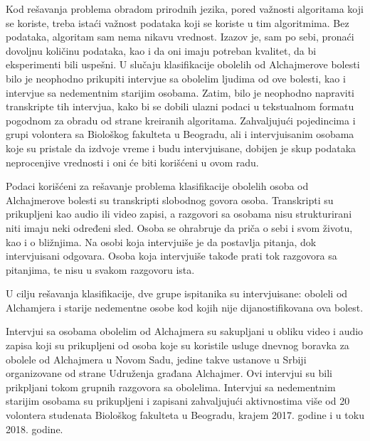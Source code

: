\documentclass[12pt,oneside]{memoir}
\begin{document}
Kod rešavanja problema obradom prirodnih jezika, pored važnosti algoritama koji se koriste, treba istaći važnost podataka koji se koriste u tim algoritmima.  Bez podataka, algoritam sam nema nikavu vrednost.  Izazov je, sam po sebi, pronaći dovoljnu količinu podataka, kao i da oni imaju potreban kvalitet, da bi eksperimenti bili uspešni.  U slučaju klasifikacije obolelih od Alchajmerove bolesti bilo je neophodno prikupiti intervjue sa obolelim ljudima od ove bolesti, kao i intervjue sa nedementnim starijim osobama. Zatim, bilo je neophodno napraviti transkripte tih intervjua, kako bi se dobili ulazni podaci u tekstualnom formatu pogodnom za obradu od strane kreiranih algoritama. Zahvaljujući pojedincima i grupi volontera sa Biološkog fakulteta u Beogradu, ali i intervjuisanim osobama koje su pristale da izdvoje vreme i budu intervjuisane, dobijen je skup podataka neprocenjive vrednosti i oni će biti korišćeni u ovom radu.

Podaci korišćeni za rešavanje problema klasifikacije obolelih osoba od Alchajmerove bolesti su transkripti slobodnog govora osoba. Transkripti su prikupljeni kao audio ili video zapisi, a razgovori sa osobama nisu strukturirani niti imaju neki određeni sled. Osoba se ohrabruje da priča o sebi i svom životu, kao i o bližnjima. Na osobi koja intervjuiše je da postavlja pitanja, dok intervjuisani odgovara. Osoba koja intervjuiše takođe prati tok razgovora sa pitanjima, te nisu u svakom razgovoru ista.

U cilju rešavanja klasifikacije, dve grupe ispitanika su intervjuisane: oboleli od Alchamjera i starije nedementne osobe kod kojih nije dijanostifikovana ova bolest.

Intervjui sa osobama obolelim od Alchajmera su sakupljani u obliku video i audio zapisa koji su prikupljeni od osoba koje su koristile usluge dnevnog boravka za obolele od Alchajmera u Novom Sadu, jedine takve ustanove u Srbiji organizovane od strane Udruženja građana Alchajmer. Ovi intervjui su bili prikpljani tokom grupnih razgovora sa obolelima. Intervjui sa nedementnim starijim osobama su prikupljeni i zapisani zahvaljujući aktivnostima više od 20 volontera studenata Biološkog fakulteta u Beogradu, krajem 2017. godine i u toku 2018. godine.
\end{document}
